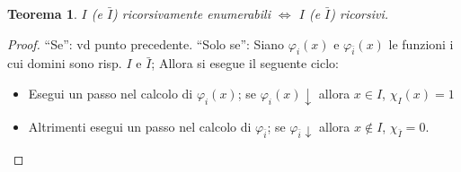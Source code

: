 \documentclass[a4paper,10pt,oneside]{article}
\theoremstyle{break}
\newtheorem{teo}{Teorema}[subsection]
\begin{document}
\begin{mdframed}


\begin{teo} $I$ (e $\bar I$) ricorsivamente enumerabili $\iff$ $I$ (e $\bar I$) ricorsivi.

\end{teo}

\dotfill

\begin{proof}
 ``Se'': vd punto precedente. ``Solo se'': Siano $\varphi_i(x)$ e $\varphi_{\bar i}(x)$ le funzioni i cui domini sono risp. $I$ e $\bar I$; Allora si esegue il seguente ciclo:
 \begin{itemize}
  \item Esegui un passo nel calcolo di $\varphi_i(x)$; se $\varphi_i(x)\downarrow$ allora $x \in I$, $\chi_I(x) = 1$
  \item Altrimenti esegui un passo nel calcolo di $\varphi_{\bar i}$; se $\varphi_{\bar i} \downarrow$ allora $x \notin I$, $\chi_{\bar I} = 0$.
 \end{itemize}

\end{proof}
\end{mdframed}
\end{document}
